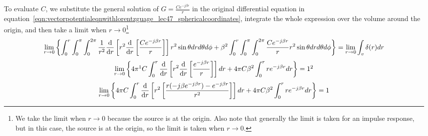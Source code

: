 To evaluate $C$, we substitute the general solution of $G = \frac{Ce^{-j\beta r}}{r}$ in the original differential equation in equation~\eqref{eqn:vectorpotentialeqnwithlorentzguage_lec47_sphericalcoordinates}, integrate the whole expression over the volume around the origin, and then take a limit when $r\rightarrow0$\footnote{
We take the limit when $r\rightarrow0$ because the source is at the origin. Also note that generally the limit is taken for an impulse response, but in this case, the source is at the origin, so the limit is taken when $r\rightarrow0$.
}
\begin{dmath*}
\lim\limits_{r\rightarrow0} \left\lbrace \int_{0}^{r} \int_{0}^{\pi}\int_{0}^{2\pi}\frac{1}{r^{2}}\derivative{}{r}\left[{r^{2}}\derivative{}{r}\left[\frac{Ce^{-j\beta r}}{r}\right]\right]r^{2}\sin\theta dr d\theta d\phi + \beta^{2} \int_{0}^{r} \int_{0}^{\pi}\int_{0}^{2\pi}\frac{Ce^{-j\beta r}}{r}r^{2}\sin\theta drd\theta d\phi\right\rbrace
= \lim\limits_{r\rightarrow0}\int_{v}\delta(r)dr
\end{dmath*}
\begin{dmath*}
\lim\limits_{r\rightarrow0}\left\lbrace 4\pi\footnotemark C\int_{0}^{r}\derivative{}{r}\left[{r^{2}}\derivative{}{r}\left[\frac{e^{-j\beta r}}{r}\right]\right]dr + 4\pi C\beta^{2}\int_{0}^{r}re^{-j\beta r}dr \right\rbrace = 1\footnotemark
\end{dmath*}
\begin{dmath*}
\lim\limits_{r\rightarrow0}\left\lbrace4\pi C\int_{0}^{r}\derivative{}{r}\left[{r^{2}}\left[\frac{r(-j\beta e^{-j\beta r}) - e^{-j\beta r}}{r^{2}}\right]\right]dr + 4\pi C\beta^{2}\int_{0}^{r}re^{-j\beta r}dr \right\rbrace = 1
\end{dmath*}
